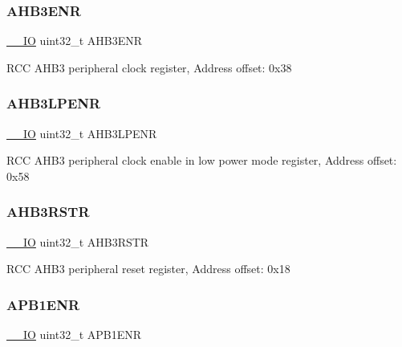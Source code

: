 \subsubsection{\texorpdfstring{A\+H\+B3\+E\+NR}{AHB3ENR}}
{\footnotesize\ttfamily \mbox{\hyperlink{core__sc300_8h_aec43007d9998a0a0e01faede4133d6be}{\+\_\+\+\_\+\+IO}} uint32\+\_\+t A\+H\+B3\+E\+NR}

R\+CC A\+H\+B3 peripheral clock register, Address offset\+: 0x38 \mbox{\label{struct_r_c_c___type_def_a2ff82b9bf0231645108965aa0febd766}} 
\subsubsection{\texorpdfstring{A\+H\+B3\+L\+P\+E\+NR}{AHB3LPENR}}
{\footnotesize\ttfamily \mbox{\hyperlink{core__sc300_8h_aec43007d9998a0a0e01faede4133d6be}{\+\_\+\+\_\+\+IO}} uint32\+\_\+t A\+H\+B3\+L\+P\+E\+NR}

R\+CC A\+H\+B3 peripheral clock enable in low power mode register, Address offset\+: 0x58 \mbox{\label{struct_r_c_c___type_def_a28560c5bfeb45326ea7f2019dba57bea}} 
\subsubsection{\texorpdfstring{A\+H\+B3\+R\+S\+TR}{AHB3RSTR}}
{\footnotesize\ttfamily \mbox{\hyperlink{core__sc300_8h_aec43007d9998a0a0e01faede4133d6be}{\+\_\+\+\_\+\+IO}} uint32\+\_\+t A\+H\+B3\+R\+S\+TR}

R\+CC A\+H\+B3 peripheral reset register, Address offset\+: 0x18 \mbox{\label{struct_r_c_c___type_def_ac88901e2eb35079b7b58a185e6bf554c}} 
\subsubsection{\texorpdfstring{A\+P\+B1\+E\+NR}{APB1ENR}}
{\footnotesize\ttfamily \mbox{\hyperlink{core__sc300_8h_aec43007d9998a0a0e01faede4133d6be}{\+\_\+\+\_\+\+IO}} uint32\+\_\+t A\+P\+B1\+E\+NR}

